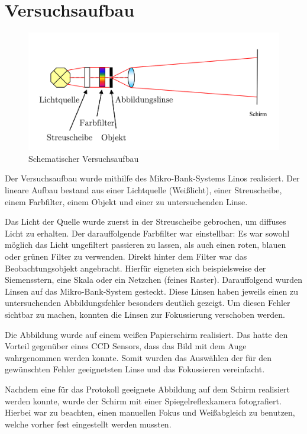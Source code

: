 \section{Versuchsaufbau}

\begin{figure}[h!]
	\includegraphics[width=\linewidth]{img/versuchsaufbau.png}
	\caption{Schematischer Versuchsaufbau}
	\label{fig:versuchsaufbau}
\end{figure}

Der Versuchsaufbau wurde mithilfe des Mikro-Bank-Systems Linos realisiert. Der lineare Aufbau bestand aus einer Lichtquelle (Weißlicht), einer Streuscheibe, einem Farbfilter, einem Objekt und einer zu untersuchenden Linse. 

Das Licht der Quelle wurde zuerst in der Streuscheibe gebrochen, um diffuses Licht zu erhalten. Der darauffolgende Farbfilter war einstellbar: Es war sowohl möglich das Licht ungefiltert passieren zu lassen, als auch einen roten, blauen oder grünen Filter zu verwenden. Direkt hinter dem Filter war das Beobachtungsobjekt angebracht. Hierfür eigneten sich beispielsweise der Siemensstern, eine Skala oder ein Netzchen (feines Raster). Darauffolgend wurden Linsen auf das Mikro-Bank-System gesteckt. Diese Linsen haben jeweils einen zu untersuchenden Abbildungsfehler besonders deutlich gezeigt. Um diesen Fehler sichtbar zu machen, konnten die Linsen zur Fokussierung verschoben werden. 

Die Abbildung wurde auf einem weißen Papierschirm realisiert. Das hatte den Vorteil gegenüber eines CCD Sensors, dass das Bild mit dem Auge wahrgenommen werden konnte. Somit wurden das Auswählen der für den gewünschten Fehler geeignetsten Linse und das Fokussieren vereinfacht.

Nachdem eine für das Protokoll geeignete Abbildung auf dem Schirm realisiert werden konnte, wurde der Schirm mit einer Spiegelreflexkamera fotografiert. Hierbei war zu beachten, einen manuellen Fokus und Weißabgleich zu benutzen, welche vorher fest eingestellt werden mussten. 

